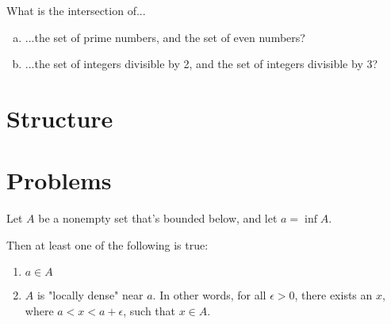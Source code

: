 \begin{exercise}
What is the intersection of...
\begin{enumerate}[(a)]
\item ...the set of prime numbers, and the set of even numbers?
\item ...the set of integers divisible by 2, and the set of integers divisible by 3?
\end{enumerate}
\end{exercise}




\section{Structure}



\section{Problems}

\begin{problem}
\label{set-inf-inclusion-density}
Let $A$ be a nonempty set that's bounded below, and let $a = \inf A$.

Then at least one of the following is true:
\begin{enumerate}[(1)]
\item $a \in A$
\item $A$ is "locally dense" near $a$. In other words, for all $\epsilon > 0$, there exists an $x$, where $a < x < a + \epsilon$, such that $x \in A$. 
\end{enumerate}
\end{problem}




